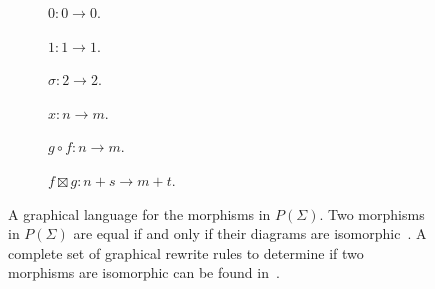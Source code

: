 \begin{figure}[t]
    \begin{subfigure}[b]{0.13\textwidth}
        \centering
        \caption{$0: 0 \to 0$.}
    \end{subfigure}
    \begin{subfigure}[b]{0.13\textwidth}
        \centering
        \vspace{-0.5em}
        \caption{$1: 1 \to 1$.}
    \end{subfigure}
    \begin{subfigure}[b]{0.16\textwidth}
        \centering
        \vspace{-0.5em}
        \caption{$\sigma: 2 \to 2$.}
    \end{subfigure}
    \begin{subfigure}[b]{0.16\textwidth}
        \centering
        \vspace{-0.5em}
        \caption{$x: n \to m$.}
    \end{subfigure}
    \begin{subfigure}[b]{0.17\textwidth}
        \centering
        \vspace{-0.5em}
        \caption{$g \circ f: n \to m$.}
    \end{subfigure}
    \begin{subfigure}[b]{0.22\textwidth}
        \centering
        \vspace{-0.5em}
        \caption{$f \boxtimes g: n + s \to m + t$.}
    \end{subfigure}
    \caption{A graphical language for the morphisms in $P( \Sigma )$. Two morphisms in $P( \Sigma )$ are equal if and only if their diagrams are isomorphic~\cite{Selinger2010}. A complete set of graphical rewrite rules to determine if two morphisms are isomorphic can be found in~\cite{Clement2023}.}
    \label{Fig:Circuits}
\end{figure}

